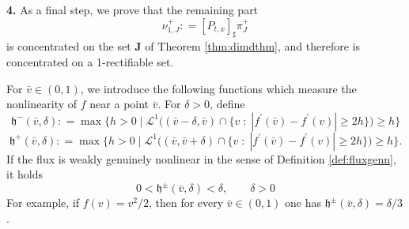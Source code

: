 \documentclass[11pt, twoside, reqno]{amsart}
\theoremstyle{definition}
\theoremstyle{remark}
\numberwithin{equation}{section}
\newcommand{\msc}[1]{\mathscr{#1}}
\begin{document}
\vspace{0.5cm}
\textbf{4.}
As a final step, we prove that the remaining part 
\begin{equation}
    \nu^+_{1,J} : =  [P_{t, x}]_{\sharp} \pi_J^+
\end{equation}
is concentrated on the set ${\mathbf J}$ of Theorem \ref{thm:dimdthm}, and therefore is concentrated on a 1-rectifiable set.

 For $\bar v \in (0, 1)$, we introduce the following functions which measure the nonlinearity of $f$ near a point $\bar v$. For $\delta > 0$, define
$$
\mathfrak h^-(\bar v, \delta) : = \max \Big\{ h > 0 \; \Big| \; \msc L^1\big( (\bar v-\delta, \bar v) \cap \{ v \; : \; |f^{\prime}(\bar v) -f^{\prime}(v) | \geq 2 h \}\big) \geq h \Big\} 
$$
$$
\mathfrak h^+(\bar v, \delta) : = \max \Big\{ h > 0 \; \Big| \; \msc L^1\big( (\bar v, \bar v+\delta) \cap \{ v \; : \; |f^{\prime}(\bar v) -f^{\prime}(v) | \geq 2 h \}\big) \geq h \Big\}. 
$$
If the flux is weakly genuinely nonlinear in the sense of Definition \ref{def:fluxgenn}, it holds
\begin{equation}
    0 < \mathfrak h^{\pm}(\bar v, \delta) < \delta, \qquad \delta > 0
\end{equation}
For example, if $f(v) = v^2/2$, then for every $\bar v \in (0, 1)$ one has $\mathfrak h^{\pm}(\bar v, \delta) =  \delta/3$.
\end{document}
